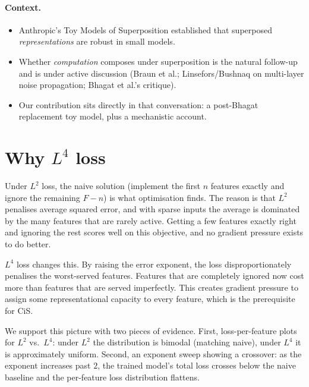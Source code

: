 \documentclass[11pt]{article}
\begin{document}
\paragraph{Context.}
\begin{itemize}
\item Anthropic's Toy Models of Superposition established that superposed \emph{representations} are robust in small models.
\item Whether \emph{computation} composes under superposition is the natural follow-up and is under active discussion (Braun et al.; Linsefors/Bushnaq on multi-layer noise propagation; Bhagat et al.'s critique).
\item Our contribution sits directly in that conversation: a post-Bhagat replacement toy model, plus a mechanistic account.
\end{itemize}

\section{Why $L^4$ loss}

Under $L^2$ loss, the naive solution (implement the first $n$ features exactly and ignore the remaining $F - n$) is what optimisation finds.
The reason is that $L^2$ penalises average squared error, and with sparse inputs the average is dominated by the many features that are rarely active.
Getting a few features exactly right and ignoring the rest scores well on this objective, and no gradient pressure exists to do better.

$L^4$ loss changes this.
By raising the error exponent, the loss disproportionately penalises the worst-served features.
Features that are completely ignored now cost more than features that are served imperfectly.
This creates gradient pressure to assign some representational capacity to every feature, which is the prerequisite for CiS.

We support this picture with two pieces of evidence.
First, loss-per-feature plots for $L^2$ vs.\ $L^4$: under $L^2$ the distribution is bimodal (matching naive), under $L^4$ it is approximately uniform.
Second, an exponent sweep showing a crossover: as the exponent increases past $2$, the trained model's total loss crosses below the naive baseline and the per-feature loss distribution flattens.
\end{document}
